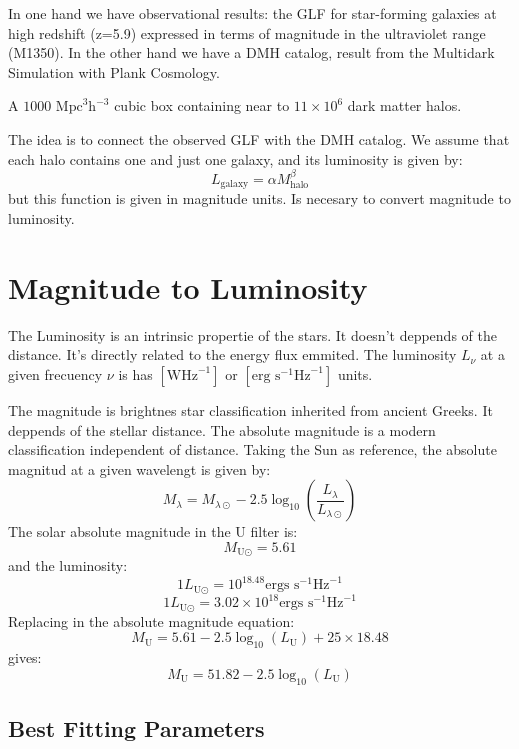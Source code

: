 \documentclass[manuscript]{aastex}
\begin{document}
  In one hand we have observational results: the GLF for star-forming galaxies at high redshift (z=5.9)\citep{bouwens06,willott13}
  expressed in terms of magnitude in the ultraviolet range (M1350). In the other hand we have a DMH 
  catalog, result from the Multidark Simulation with Plank Cosmology. %

  A $1000 \textrm{ Mpc} ^3 \textrm{h}^{−3}$ cubic box containing near to $11\times10^6$ dark matter halos.

  The idea is to connect the observed GLF with the DMH catalog. We assume that each halo contains one and just one galaxy, and its luminosity is given by:
  \begin{equation}
  L_\textrm{galaxy}=\alpha M_\textrm{halo}^\beta 
  \end{equation}
  but this function is given in magnitude units. Is necesary to convert magnitude to luminosity.

\section{Magnitude to Luminosity}
  The Luminosity is an intrinsic propertie of the stars. It doesn't deppends of the distance. 
  It's directly related to the energy flux emmited. The luminosity $L_\nu$ at a given frecuency 
  $\nu$ is has $[\textrm{W}\textrm{Hz}^{-1}]$ or $[\textrm{erg }\textrm{s}^{-1}\textrm{Hz}^{-1}]$ units.

  The magnitude is brightnes star classification inherited from ancient Greeks. It deppends of 
  the stellar distance. The absolute magnitude is a modern classification independent of 
  distance. Taking the Sun as reference, the absolute magnitud at a given wavelengt is given by: 
  \[ M_{\lambda} = M_{\lambda \odot} - 2.5 \log_{10}\left( \frac{L_\lambda}{L_{\lambda \odot}} \right) \]
  The solar absolute magnitude in the U filter is:
  \[ M_{\textrm{U} \odot} = 5.61\]
  and the luminosity:
  \[ 1 L_{\textrm{U} \odot} = 10^{18.48} \textrm{ergs s}^{-1}\textrm{Hz}^{-1}\]
  \[ 1 L_{\textrm{U} \odot} = 3.02 \times 10^{18} \textrm{ergs s}^{-1}\textrm{Hz}^{-1}\]
  Replacing in the absolute magnitude equation:
  \[ M_{\textrm{U}} = 5.61 - 2.5 \log_{10}(L_{\textrm{U}}) + 25\times18.48\]
  gives:
  \[ M_{\textrm{U}} = 51.82 - 2.5 \log_{10}(L_{\textrm{U}}) \]

  \subsection{Best Fitting Parameters}
\end{document}
